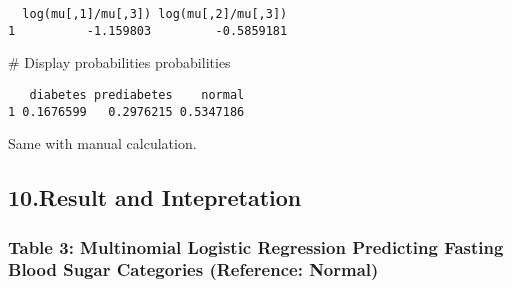 \documentclass[
  letterpaper,
  DIV=11,
  numbers=noendperiod]{scrartcl}
\newenvironment{Shaded}{\begin{snugshade}}{\end{snugshade}}
\newcommand{\CommentTok}[1]{\textcolor[rgb]{0.37,0.37,0.37}{#1}}
\newcommand{\NormalTok}[1]{\textcolor[rgb]{0.00,0.23,0.31}{#1}}
\begin{document}
\begin{verbatim}
  log(mu[,1]/mu[,3]) log(mu[,2]/mu[,3])
1          -1.159803         -0.5859181
\end{verbatim}

\begin{Shaded}
\begin{Highlighting}[]
\CommentTok{\# Display probabilities}
\NormalTok{probabilities}
\end{Highlighting}
\end{Shaded}

\begin{verbatim}
   diabetes prediabetes    normal
1 0.1676599   0.2976215 0.5347186
\end{verbatim}

Same with manual calculation.

\subsection{10.Result and Intepretation}\label{result-and-intepretation}

\subsubsection{\texorpdfstring{\textbf{Table 3: Multinomial Logistic
Regression Predicting Fasting Blood Sugar Categories (Reference:
Normal)}}{Table 3: Multinomial Logistic Regression Predicting Fasting Blood Sugar Categories (Reference: Normal)}}\label{table-3-multinomial-logistic-regression-predicting-fasting-blood-sugar-categories-reference-normal}
\end{document}
